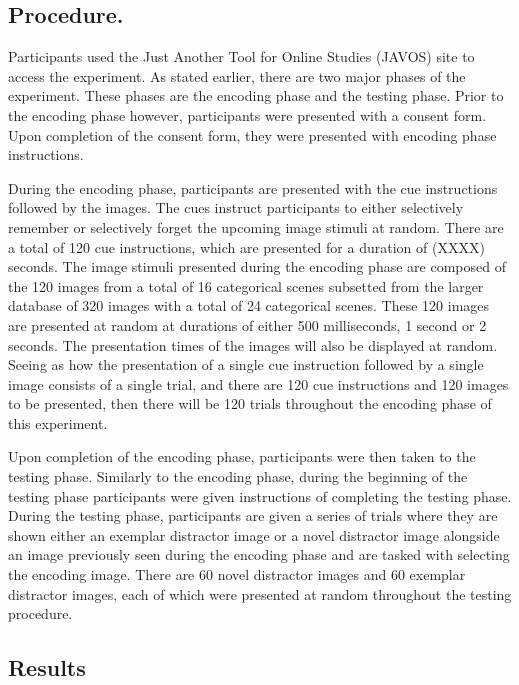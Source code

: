 \documentclass[
  man,floatsintext]{apa6}
\begin{document}
\hypertarget{procedure.}{%
\subsection{Procedure.}\label{procedure.}}

Participants used the Just Another Tool for Online Studies (JAVOS) site to access the experiment. As stated earlier, there are two major phases of the experiment. These phases are the encoding phase and the testing phase. Prior to the encoding phase however, participants were presented with a consent form. Upon completion of the consent form, they were presented with encoding phase instructions.

During the encoding phase, participants are presented with the cue instructions followed by the images. The cues instruct participants to either selectively remember or selectively forget the upcoming image stimuli at random. There are a total of 120 cue instructions, which are presented for a duration of (XXXX) seconds. The image stimuli presented during the encoding phase are composed of the 120 images from a total of 16 categorical scenes subsetted from the larger database of 320 images with a total of 24 categorical scenes. These 120 images are presented at random at durations of either 500 milliseconds, 1 second or 2 seconds. The presentation times of the images will also be displayed at random. Seeing as how the presentation of a single cue instruction followed by a single image consists of a single trial, and there are 120 cue instructions and 120 images to be presented, then there will be 120 trials throughout the encoding phase of this experiment.

Upon completion of the encoding phase, participants were then taken to the testing phase. Similarly to the encoding phase, during the beginning of the testing phase participants were given instructions of completing the testing phase. During the testing phase, participants are given a series of trials where they are shown either an exemplar distractor image or a novel distractor image alongside an image previously seen during the encoding phase and are tasked with selecting the encoding image. There are 60 novel distractor images and 60 exemplar distractor images, each of which were presented at random throughout the testing procedure.

\hypertarget{results}{%
\subsection{Results}\label{results}}
\end{document}
